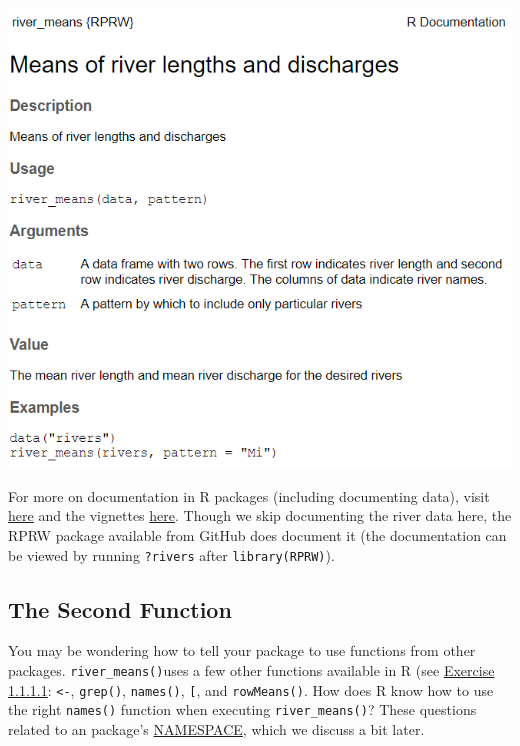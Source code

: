 \documentclass[
]{book}
\begin{document}
\includegraphics[width=1\linewidth]{images/newrpack_example}

For more on documentation in R packages (including documenting data), visit \href{https://r-pkgs.org/man.html\#man}{here} and the vignettes \href{https://cran.r-project.org/web/packages/roxygen2/index.html}{here}. Though we skip documenting the river data here, the RPRW package available from GitHub does document it (the documentation can be viewed by running \texttt{?rivers} after \texttt{library(RPRW)}).

\hypertarget{second-function}{%
\subsection{The Second Function}\label{second-function}}

You may be wondering how to tell your package to use functions from other packages. \texttt{river\_means()}uses a few other functions available in R (see \protect\hyperlink{ex-set1}{Exercise 1.1.1.1}: \texttt{\textless{}-}, \texttt{grep()}, \texttt{names()}, \texttt{{[}}, and \texttt{rowMeans()}. How does R know how to use the right \texttt{names()} function when executing \texttt{river\_means()}? These questions related to an package's \protect\hyperlink{namespace}{NAMESPACE}, which we discuss a bit later.
\end{document}
